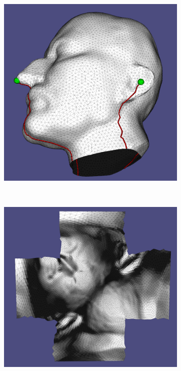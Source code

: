 \begin{figure}
\centering
\begin{subfigure}{0.25\textwidth}
\includegraphics[height = \textwidth]{images/max_global}
\caption{}
\end{subfigure}\ \ \ \ \ \ \ \ \ 
\begin{subfigure}{0.25\textwidth}
\includegraphics[height = \textwidth]{images/max_global_emb}

\end{subfigure}
\end{figure}

